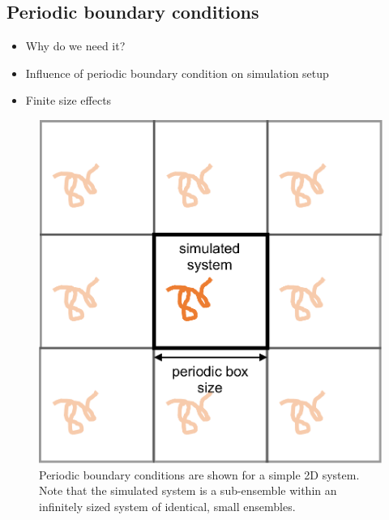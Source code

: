 \documentclass[9pt,bestpractices]{livecoms}
\begin{document}
\subsection{Periodic boundary conditions}
\label{sec:periodic}
\begin{itemize}
\item Why do we need it?
\item Influence of periodic boundary condition on simulation setup
\item Finite size effects
\end{itemize}

\begin{figure}[h]
\centering
\includegraphics[width=\linewidth]{PBC_figure.pdf}
\caption{Periodic boundary conditions are shown for a simple 2D system. Note that the simulated system is a sub-ensemble within an infinitely sized system of identical, small ensembles.}
\label{pbcfig}
\end{figure}
\end{document}
